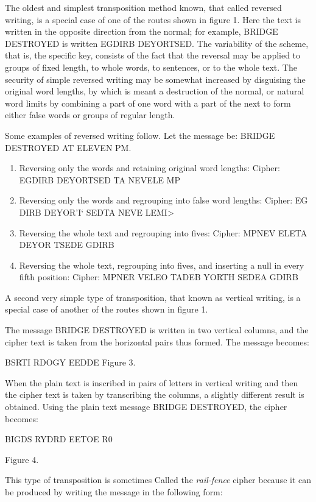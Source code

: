 \mypara The oldest and simplest transposition method known, that called reversed writing, is a special case of one of the routes shown in figure 1.
Here the text is written in the opposite direction from the normal; for
example, BRIDGE DESTROYED is written EGDIRB DEYORTSED.
The variability of the scheme, that is, the specific key, consists of the fact
that the reversal may be applied to groups of fixed length, to whole
words, to sentences, or to the whole text. The security of simple reversed
writing may be somewhat increased by disguising the original word
lengths, by which is meant a destruction of the normal, or natural word
limits by combining a part of one word with a part of the next to form
either false words or groups of regular length.

\mypara Some examples of reversed writing follow. Let the message be:
BRIDGE DESTROYED AT ELEVEN PM.

\begin{enumerate}
\item Reversing only the words and retaining original word lengths:
Cipher: EGDIRB DEYORTSED TA NEVELE MP
\item Reversing only the words and regrouping into false word
lengths:
Cipher: EG DIRB DEYOR'I‘ SEDTA NEVE LEMI>
\item Reversing the whole text and regrouping into fives:
Cipher: MPNEV ELETA DEYOR TSEDE GDIRB
\item Reversing the whole text, regrouping into fives, and inserting
a null in every fifth position:
Cipher: MPNER VELEO TADEB YORTH SEDEA GDIRB
\end{enumerate}

\mypara A second very simple type of transposition, that known as vertical
writing, is a special case of another of the routes shown in figure 1.

The message BRIDGE DESTROYED is written in two vertical
columns, and the cipher text is taken from the horizontal pairs
thus formed. The message becomes:

BSRTI RDOGY EEDDE
Figure 3.

When the plain text is inscribed in pairs of letters in vertical
writing and then the cipher text is taken by transcribing the
columns, a slightly different result is obtained. Using the plain
text message BRIDGE DESTROYED, the cipher becomes:

BIGDS RYDRD EETOE R0

Figure 4.

This type of transposition is sometimes Called the \textit{rail-fence} cipher
because it can be produced by writing the message in the following form:

